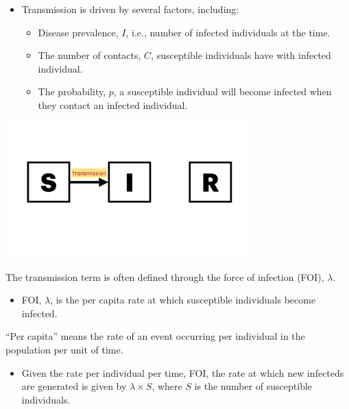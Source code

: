 \documentclass[
  ignorenonframetext,
]{beamer}
\providecommand{\tightlist}{%
  \setlength{\itemsep}{0pt}\setlength{\parskip}{0pt}}\usepackage{longtable,booktabs,array}
\begin{document}
\begin{frame}
\begin{itemize}
\tightlist
\item
  Transmission is driven by several factors, including:

  \begin{itemize}
  \tightlist
  \item
    Disease prevalence, {\(I\)}, i.e., number of infected individuals at
    the time.
  \item
    The number of contacts, {\(C\)}, susceptible individuals have with
    infected individual.
  \item
    The probability, {\(p\)}, a susceptible individual will become
    infected when they contact an infected individual.
  \end{itemize}
\end{itemize}
\end{frame}

\begin{frame}
\includegraphics[width=0.7\textwidth,height=\textheight]{images/model_diagrams/model_diagrams.002.jpeg}

The transmission term is often defined through the {force of infection
(FOI), \(\lambda\)}.
\end{frame}

\begin{frame}
\begin{itemize}
\tightlist
\item
  FOI, \(\lambda\), is the {per capita rate} at which susceptible
  individuals become infected.
\end{itemize}

\begin{tcolorbox}[enhanced jigsaw, toprule=.15mm, opacityback=0, bottomtitle=1mm, opacitybacktitle=0.6, colframe=quarto-callout-note-color-frame, titlerule=0mm, breakable, colback=white, title={Note}, left=2mm, colbacktitle=quarto-callout-note-color!10!white, arc=.35mm, coltitle=black, bottomrule=.15mm, rightrule=.15mm, leftrule=.75mm, toptitle=1mm]

``Per capita'' means the rate of an event occurring per individual in
the population per unit of time.

\end{tcolorbox}

\begin{itemize}
\tightlist
\item
  Given the rate per individual per time, FOI, the rate at which new
  infecteds are generated is given by {\(\lambda \times S\)}, where
  \(S\) is the number of susceptible individuals.
\end{itemize}
\end{frame}
\end{document}
